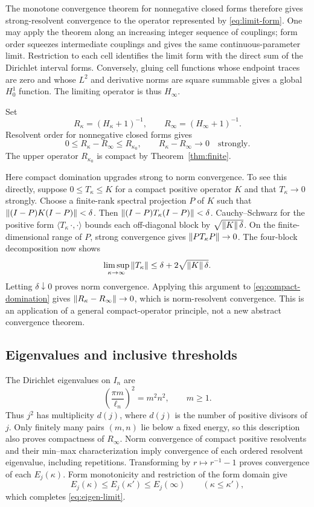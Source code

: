 The monotone convergence theorem for nonnegative closed
forms therefore gives strong-resolvent convergence to
the operator represented by \eqref{eq:limit-form}.
One may apply the theorem along an increasing integer
sequence of couplings; form order squeezes intermediate
couplings and gives the same continuous-parameter limit.
Restriction to each cell identifies the limit form with
the direct sum of the Dirichlet interval forms.
Conversely, gluing cell functions whose endpoint traces
are zero and whose $L^2$ and derivative norms are square
summable gives a global $H^1_0$ function.
The limiting operator is thus $H_\infty$.

Set
\[
R_\kappa=(H_\kappa+1)^{-1},
\qquad R_\infty=(H_\infty+1)^{-1}.
\]
Resolvent order for nonnegative closed forms gives
\begin{equation}
0\le R_\kappa-R_\infty\le R_{\kappa_0},
\qquad
R_\kappa-R_\infty\longrightarrow0
\quad\text{strongly}.
\label{eq:compact-domination}
\end{equation}
The upper operator $R_{\kappa_0}$ is compact by
Theorem~\ref{thm:finite}.

Here compact domination upgrades strong to norm convergence.
To see this directly, suppose $0\le T_\kappa\le K$
for a compact positive operator $K$ and that
$T_\kappa\to0$ strongly.
Choose a finite-rank spectral projection $P$ of $K$ such
that $\left\lVert (I-P)K(I-P)\right\rVert<\delta$.
Then
$\left\lVert (I-P)T_\kappa(I-P)\right\rVert<\delta$.
Cauchy--Schwarz for the positive form
$\langle T_\kappa\,\cdot,\cdot\rangle$ bounds each
off-diagonal block by $\sqrt{\left\lVert K\right\rVert\delta}$.
On the finite-dimensional range of $P$, strong convergence
gives $\left\lVert PT_\kappa P\right\rVert\to0$.
The four-block decomposition now shows
\[
\limsup_{\kappa\to\infty}\left\lVert T_\kappa\right\rVert
\le\delta+2\sqrt{\left\lVert K\right\rVert\delta}.
\]
Letting $\delta\downarrow0$ proves norm convergence.
Applying this argument to \eqref{eq:compact-domination}
gives $\left\lVert R_\kappa-R_\infty\right\rVert\to0$, which is
norm-resolvent convergence.
This is an application of a general compact-operator
principle, not a new abstract convergence theorem.

\subsection{Eigenvalues and inclusive thresholds}

The Dirichlet eigenvalues on $I_n$ are
\[
\left(\frac{\pi m}{\ell_n}\right)^2=m^2n^2,
\qquad m\ge1.
\]
Thus $j^2$ has multiplicity $d(j)$, where $d(j)$ is the
number of positive divisors of $j$.
Only finitely many pairs $(m,n)$ lie below a fixed energy,
so this description also proves compactness of
$R_\infty$.
Norm convergence of compact positive resolvents and their
min--max characterization imply convergence of each
ordered resolvent eigenvalue, including repetitions.
Transforming by $r\mapsto r^{-1}-1$ proves convergence
of each $E_j(\kappa)$.
Form monotonicity and restriction of the form domain give
\[
E_j(\kappa)\le E_j(\kappa')\le E_j(\infty)
\qquad(\kappa\le\kappa'),
\]
which completes \eqref{eq:eigen-limit}.

